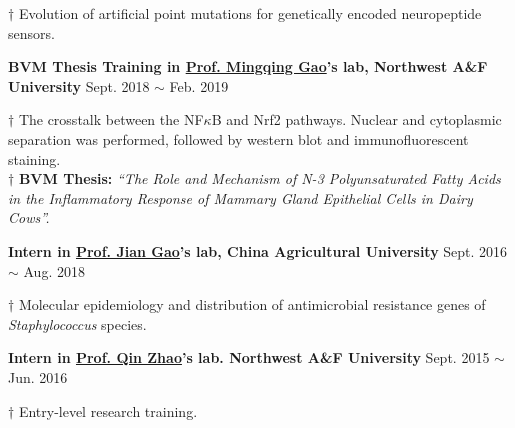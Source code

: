 {\small
$\dagger$ Evolution of artificial point mutations for genetically encoded neuropeptide sensors.
}


\vspace{5pt}


\textbf{BVM Thesis Training in \href{https://faculty.nwu.edu.cn/gaomingqing/zh_CN/index.htm}{Prof. Mingqing Gao}'s lab, Northwest A\&F University} \hfill Sept. 2018 $\sim$ Feb. 2019

{\small
$\dagger$ The crosstalk between the NF$\kappa$B and Nrf2 pathways. Nuclear and cytoplasmic separation was performed, followed by western blot and immunofluorescent staining.\\
$\dagger$ \textbf{BVM Thesis:} \textit{``The Role and Mechanism of N-3 Polyunsaturated Fatty Acids in the Inflammatory Response of Mammary Gland Epithelial Cells in Dairy Cows''.}
}


\vspace{5pt}


\textbf{Intern in \href{https://cvm.cau.edu.cn/art/2017/9/12/art_41957_71.html}{Prof. Jian Gao}'s lab, China Agricultural University} \hfill Sept. 2016 $\sim$ Aug. 2018

{\small
$\dagger$ Molecular epidemiology and distribution of antimicrobial resistance genes of \textit{Staphylococcus} species\cite{zhao2018detection,qu2019molecular}.
}

\vspace{5pt}

\textbf{Intern in \href{https://dyxy.nwsuaf.edu.cn/en/People/FullProfessor/5e6012bf013a499c946289472b285795.htm}{Prof. Qin Zhao}'s lab. Northwest A\&F University} \hfill Sept. 2015 $\sim$ Jun. 2016

{\small
$\dagger$ Entry-level research training.
}